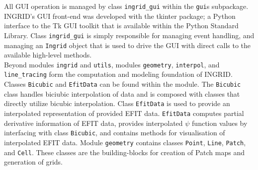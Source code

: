 All GUI operation is managed by class \texttt{ingrid\_gui} within the \texttt{gui}s subpackage. INGRID's GUI front-end was developed with the tkinter package; a Python interface to the Tk GUI toolkit that is available within the Python Standard Library. Class \texttt{ingrid\_gui} is simply responsible for managing event handling, and managing an \texttt{Ingrid} object that is used to drive the GUI with direct calls to the available high-level methods.\\ \indent
Beyond modules \texttt{ingrid} and \texttt{utils}, modules \texttt{geometry}, \texttt{interpol}, and \texttt{line\_tracing} form the computation and modeling foundation of INGRID. Classes \texttt{Bicubic} and \texttt{EfitData} can be found within the  module. The \texttt{Bicubic} class handles biciubic interpolation of data and is composed with classes that directly utilize bicubic interpolation. Class \texttt{EfitData} is used to provide an interpolated representation of provided EFIT data. \texttt{EfitData} computes partial derivative information of EFIT data, provides interpolated $\psi$ function values by interfacing with class \texttt{Bicubic}, and contains methods for visualisation of interpolated EFIT data. Module \texttt{geometry} contains classes \texttt{Point}, \texttt{Line}, \texttt{Patch}, and \texttt{Cell}. These classes are the building-blocks for creation of Patch maps and generation of grids.